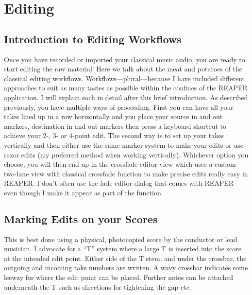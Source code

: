\documentclass[10pt,american]{article}
\begin{document}
\section{Editing}

\subsection{Introduction to Editing Workflows}

Once you have recorded or imported your classical music audio, you are ready to
start editing the raw material! Here we talk about the meat and potatoes of the
classical editing workflows. Workflows---plural---because I have included
different approaches to suit as many tastes as possible within the confines of
the REAPER application. I will explain each in detail after this brief
introduction. As described previously, you have multiple ways of proceeding.
First you can have all your takes lined up in a row horizontally and you place
your source in and out markers, destination in and out markers then press a
keyboard shortcut to achieve your 2-, 3- or 4-point edit. The second way is to
set up your takes vertically and then either use the same marker system to make
your edits or use razor edits (my preferred method when working vertically).
Whichever option you choose, you will then end up in the crossfade editor view
which uses a custom two-lane view with classical crossfade function to make
precise edits really easy in REAPER. I don't often use the fade editor dialog
that comes with REAPER even though I make it appear as part of the function.

\subsection{Marking Edits on your Scores}

This is best done using a physical, photocopied score by the conductor or lead
musician. I advocate for a \textquotedblleft T\textquotedblright{} system where
a large T is inserted into the score at the intended edit point. Either side of
the T stem, and under the crossbar, the outgoing and incoming take numbers are
written. A wavy crossbar indicates some leeway for where the edit point can be
placed. Further notes can be attached underneath the T such as directions for
tightening the gap etc.
\end{document}
